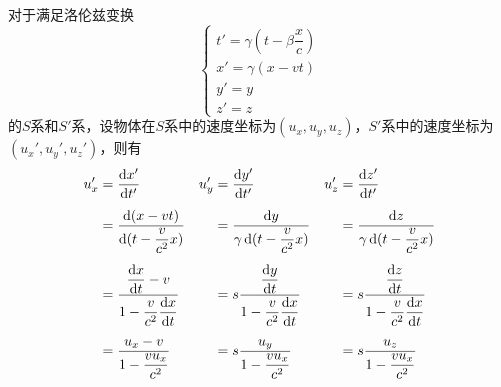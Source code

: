 \begin{prove}
对于满足洛伦兹变换
\[\left\{\begin{array}{l}
	t'=\gamma(t-\beta\dfrac{x}{c})\\
	x'=\gamma(x-vt)\\
	y'=y\\
	z'=z
\end{array}\right.\]
的$S$系和$S'$系，设物体在$S$系中的速度坐标为$(u_x,u_y,u_z)$，$S'$系中的速度坐标为$(u_x',u_y',u_z')$，则有
\[\begin{aligned}
	u_x'&=\dfrac{\dif x'}{\dif t'}&u_y'&=\dfrac{\dif y'}{\dif t'}&u_z'&=\dfrac{\dif z'}{\dif t'}\\[1ex]
	&=\dfrac{\dif(x-vt)}{\dif(t-\dfrac{v}{c^2}x)}&&=\dfrac{\dif y}{\gamma\dif(t-\dfrac{v}{c^2}x)}&&=\dfrac{\dif z}{\gamma\dif(t-\dfrac{v}{c^2}x)}\\[1ex]
	&=\dfrac{\dfrac{\dif x}{\dif t}-v}{1-\dfrac{v}{c^2}\dfrac{\dif x}{\dif t}}&&=s\dfrac{\dfrac{\dif y}{\dif t}}{1-\dfrac{v}{c^2}\dfrac{\dif x}{\dif t}}&&=s\dfrac{\dfrac{\dif z}{\dif t}}{1-\dfrac{v}{c^2}\dfrac{\dif x}{\dif t}}\\[1ex]
	&=\dfrac{u_x-v}{1-\dfrac{vu_x}{c^2}}&&=s\dfrac{u_y}{1-\dfrac{vu_x}{c^2}}&&=s\dfrac{u_z}{1-\dfrac{vu_x}{c^2}}
\end{aligned}\]

\end{prove}

